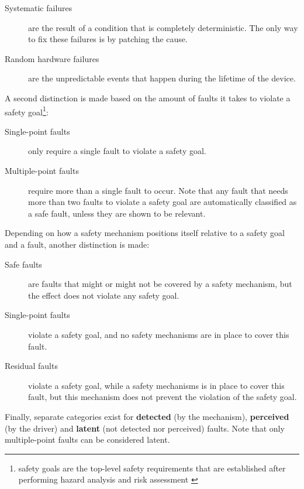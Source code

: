\documentclass[10pt]{article}
\begin{document}
    \begin{description}
      \item[Systematic failures] are the result of a condition that is completely deterministic. The only way to fix these failures is by patching the cause.
      \item[Random hardware failures] are the unpredictable events that happen during the lifetime of the device. 
    \end{description}

    \noindent A second distinction is made based on the amount of faults it takes to violate a safety goal\footnote{safety goals are the top-level safety requirements that are established after performing hazard analysis and risk assessment \cite{iso26262-1}}:

    \begin{description}
    \item[Single-point faults] only require a single fault to violate a safety goal.

    \item[Multiple-point faults] require more than a single fault to occur. Note that any fault that needs more than two faults to violate a safety goal are automatically classified as a safe fault, unless they are shown to be relevant.
    \end{description}


    \noindent Depending on how a safety mechanism positions itself relative to a safety goal and a fault, another distinction is made: 

    \begin{description}
    \item[Safe faults]  are faults that might or might not be covered by a safety mechanism, but the effect does not violate any safety goal.

    \item[Single-point faults] violate a safety goal, and no safety mechanisms are in place to cover this fault.

    \item[Residual faults] violate a safety goal, while a safety mechanisms is in place to cover this fault, but this mechanism does not prevent the violation of the safety goal.
    \end{description}

    \noindent Finally, separate categories exist for \textbf{detected} (by the mechanism), \textbf{perceived} (by the driver) and \textbf{latent} (not detected nor perceived) faults. Note that only multiple-point faults can be considered latent. 
\end{document}
